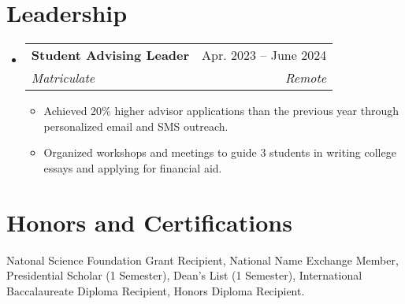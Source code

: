 \documentclass[letterpaper,11pt]{article}
\makeatletter
\newcommand{\resumeItem}[1]{
  \item\small{
    {#1 \vspace{-2pt}}
  }
}
\newcommand{\resumeSubheading}[4]{
  \vspace{-2pt}\item
    \begin{tabular*}{0.97\textwidth}[t]{l@{\extracolsep{\fill}}r}
      \textbf{#1} & #2 \\
      \textit{\small#3} & \textit{\small #4} \\
    \end{tabular*}\vspace{-7pt}
}
\newcommand{\resumeSubHeadingListStart}{\begin{itemize}[leftmargin=0.15in, label={}]}
\newcommand{\resumeSubHeadingListEnd}{\end{itemize}}
\newcommand{\resumeItemListStart}{\begin{itemize}}
\newcommand{\resumeItemListEnd}{\end{itemize}\vspace{-5pt}}
\makeatother
\begin{document}
\section{Leadership}
  \resumeSubHeadingListStart
    \resumeSubheading
      {Student Advising Leader}{Apr. 2023 -- June 2024}
      {Matriculate}{Remote}
      \resumeItemListStart
        \resumeItem{Achieved 20\% higher advisor applications than the previous year through personalized email and SMS outreach.}
        \resumeItem{Organized workshops and meetings to guide 3 students in writing college essays and applying for financial aid.}
      \resumeItemListEnd
  \resumeSubHeadingListEnd

\section{Honors and Certifications}
 \begin{itemize}[leftmargin=0.15in, label={}]
    \small{\item{
     \textbf{}{Natonal Science Foundation Grant Recipient, National Name Exchange Member, Presidential Scholar (1 Semester), Dean’s List (1 Semester), International Baccalaureate Diploma Recipient, Honors Diploma Recipient.} \\
    }}
 \end{itemize}


\end{document}
